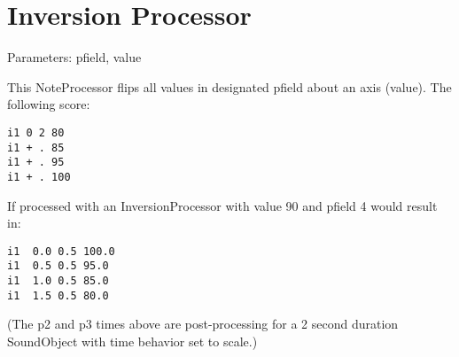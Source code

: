 \section{Inversion Processor}\label{inversionProcessor}

Parameters: pfield, value

This NoteProcessor flips all values in designated pfield about an axis
(value). The following score:

\begin{verbatim}
i1 0 2 80
i1 + . 85
i1 + . 95
i1 + . 100
\end{verbatim}

If processed with an InversionProcessor with value 90 and pfield 4 would
result in:

\begin{verbatim}
i1  0.0 0.5 100.0
i1  0.5 0.5 95.0
i1  1.0 0.5 85.0
i1  1.5 0.5 80.0    
\end{verbatim}

(The p2 and p3 times above are post-processing for a 2 second duration
SoundObject with time behavior set to scale.)
